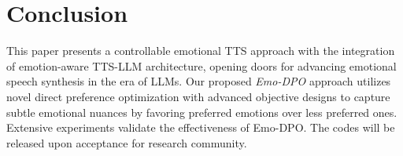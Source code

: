 \documentclass[conference]{IEEEtran}
\begin{document}
\vspace{-0.2cm}
\section{Conclusion}
\vspace{-0.2cm}
This paper presents a controllable emotional TTS approach with the integration of emotion-aware TTS-LLM architecture, opening doors for advancing emotional speech synthesis in the era of LLMs. Our proposed \textit{Emo-DPO} approach utilizes novel direct preference optimization with advanced objective designs to capture subtle emotional nuances by favoring preferred emotions over less preferred ones. Extensive experiments validate the effectiveness of Emo-DPO. 
The codes will be released upon acceptance for research community.



\footnotesize


\end{document}
